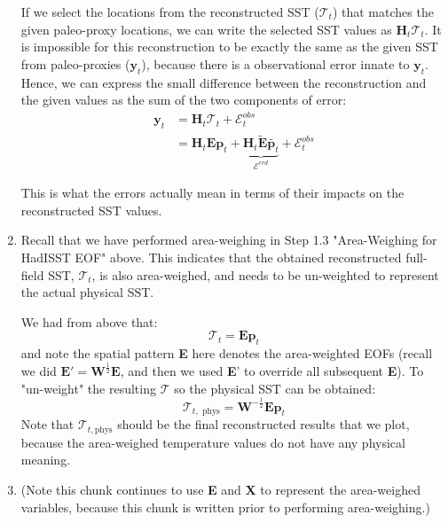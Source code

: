 \documentclass{article}
\begin{document}
\begin{enumerate}
    If we select the locations from the reconstructed SST ($\mathcal{T}_t$) that matches the given paleo-proxy locations, we can write the selected SST values as $\textbf{H}_t \mathcal{T}_t$. 
    It is impossible for this reconstruction to be exactly the same as the given SST from paleo-proxies ($\textbf{y}_t$), because there is a observational error innate to $\textbf{y}_t$.
    Hence, we can express the small difference between the reconstruction and the given values as the sum of the two components of error:
    \begin{align*}
        \textbf{y}_t &= \textbf{H}_t \mathcal{T}_t + \mathcal{E}^{obs}_t \\
        &= \textbf{H}_t \textbf{E} \textbf{p}_t + \underbrace{\textbf{H}_t \tilde{\textbf{E}} \tilde{\textbf{p}_t}}_{\mathcal{E}^{red}} + \mathcal{E}^{obs}_t
    \end{align*}

    This is what the errors actually mean in terms of their impacts on the reconstructed SST values.

    \item Recall that we have performed area-weighing in Step 1.3 "Area-Weighing for HadISST EOF" above.
    This indicates that the obtained reconstructed full-field SST, $\mathcal{T}_t$, is also area-weighed, and needs to be un-weighted to represent the actual physical SST.
    
    We had from above that:
    $$\mathcal{T}_t = \textbf{Ep}_t$$
    and note the spatial pattern \textbf{E} here denotes the area-weighted EOFs (recall we did $\textbf{E}' = \textbf{W}^{\frac{1}{2}} \textbf{E}$, and then we used \textbf{E}' to override all subsequent \textbf{E}).
    To "un-weight" the resulting $\mathcal{T}$ so the physical SST can be obtained:
    $$\mathcal{T}_{t, \text{ phys}} = \textbf{W}^{-\frac{1}{2}} \textbf{E} \textbf{p}_t$$
    Note that $\mathcal{T}_{t, \text{phys}}$ should be the final reconstructed results that we plot, because the area-weighed temperature values do not have any physical meaning.

    \item (Note this chunk continues to use \textbf{E} and \textbf{X} to represent the area-weighed variables, because this chunk is written prior to performing area-weighing.)
    

\end{enumerate}
\end{document}
